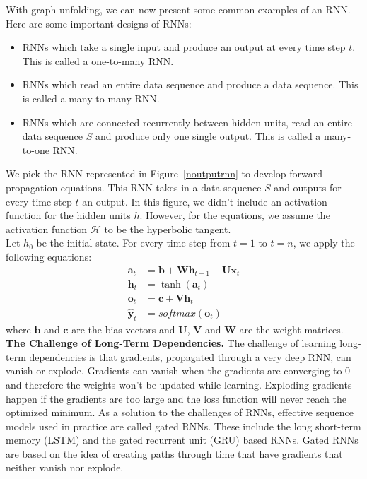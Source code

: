 
With graph unfolding, we can now present some common examples of an RNN. Here are
some important designs of RNNs:\\

\begin{itemize}
  \item RNNs which take a single input and produce an output at every time step
    $t$. This is called a one-to-many RNN.\\
  \item RNNs which read an entire data sequence and produce a data sequence.
    This is called a many-to-many RNN.\\
  \item RNNs which are connected recurrently between hidden units, read an
    entire data sequence $S$ and produce only one single output. This is called
    a many-to-one RNN.\\
\end{itemize}



We pick the RNN represented in Figure~\ref{noutputrnn} to develop forward
propagation equations. This RNN takes in a data sequence $S$ and outputs for
every time step $t$ an output. In this figure, we didn't include an
activation function for the hidden units $h$. However, for the equations, we
assume the activation function $\mathcal{H}$ to be the hyperbolic tangent.\\

Let $h_{0}$ be the initial state. For every time step from $t = 1$ to $t =
n$, we apply the following equations:
\begin{align}
  \bm{a}_{t} & = \bm{b} + \bm{Wh}_{t-1} + \bm{Ux}_{t} \\
  \bm{h}_{t} & = \tanh(\bm{a}_{t}) \\
  \bm{o}_{t} & = \bm c + \bm{Vh}_{t} \\
  \bm{\hat y}_{t} & = softmax(\bm o_{t})
\end{align}
where $\bm b$ and $\bm c$ are the bias vectors and $\bm U$, $\bm V$ and $\bm W$ are
the weight matrices.\\


\textbf{The Challenge of Long-Term Dependencies.} The challenge of learning
long-term dependencies is that gradients, propagated through a very deep RNN,
can vanish or explode. Gradients can vanish when the gradients are converging to
$0$ and therefore the weights won't be updated while learning. Exploding
gradients happen if the gradients are too large and the loss function will never
reach the optimized minimum. As a solution to the challenges of RNNs, effective
sequence models used in practice are called gated RNNs. These include the long
short-term memory (LSTM) and the gated recurrent unit (GRU) based RNNs. Gated
RNNs are based on the idea of creating paths through time that have gradients
that neither vanish nor explode.\cite{doi:10.1162/neco.1997.9.8.1735}~\\
